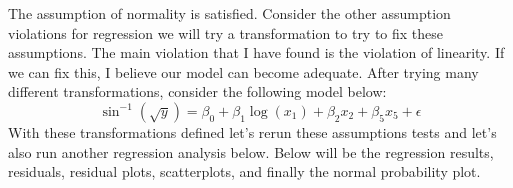 \documentclass[12pt,letterpaper]{article}
\begin{document}
The assumption of normality is satisfied. Consider the other assumption violations for regression we will try a transformation to try to fix these assumptions. The main violation that I have found is the violation of linearity. If we can fix this, I believe our model can become adequate. After trying many different transformations\cite{text1}, consider the following model below: $$\sin^{-1}\left(\sqrt{y}\right)=\beta_0+\beta_1\log\left(x_1\right)+\beta_2x_2+\beta_5x_5+\epsilon$$ With these transformations defined let's rerun these assumptions tests and let's also run another regression analysis below. Below will be the regression results, residuals, residual plots, scatterplots, and finally the normal probability plot.

\begin{mdframed}

\end{mdframed}

\begin{mdframed}

\end{mdframed}
\end{document}
